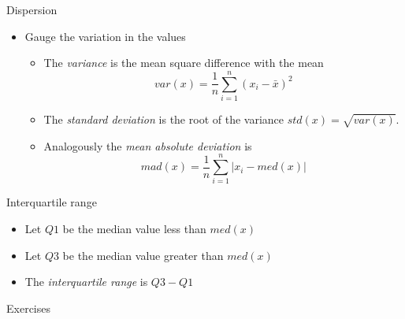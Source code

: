 \documentclass{beamer}
\begin{document}
\begin{frame}{Dispersion}  
\begin{itemize} 
 \item Gauge the variation in the values 
\begin{itemize} 
\item The \emph{variance} is the mean square difference with the mean 
\begin{displaymath} 
 var(x) = \frac{1}{n}\sum_{i=1}^n (x_i - \bar{x})^2
\end{displaymath}
 \item The \emph{standard deviation} is the root of the variance $std(x) = \sqrt{var(x)}$. 
\item Analogously the \emph{mean absolute deviation} is 
\begin{displaymath} 
  mad(x) = \frac{1}{n}\sum_{i=1}^n |x_i - med(x)|
\end{displaymath}
\end{itemize}
\end{itemize}
\end{frame}

\begin{frame}{Interquartile range} 
 \begin{itemize} 
  \item Let $Q1$ be the median value less than $med(x)$ 
  \item Let $Q3$ be the median value greater than $med(x)$
  \item The \emph{interquartile range} is $Q3 - Q1$ 
 \end{itemize}
\end{frame}

\begin{frame}{Exercises}  
 
\end{frame}
\end{document}
